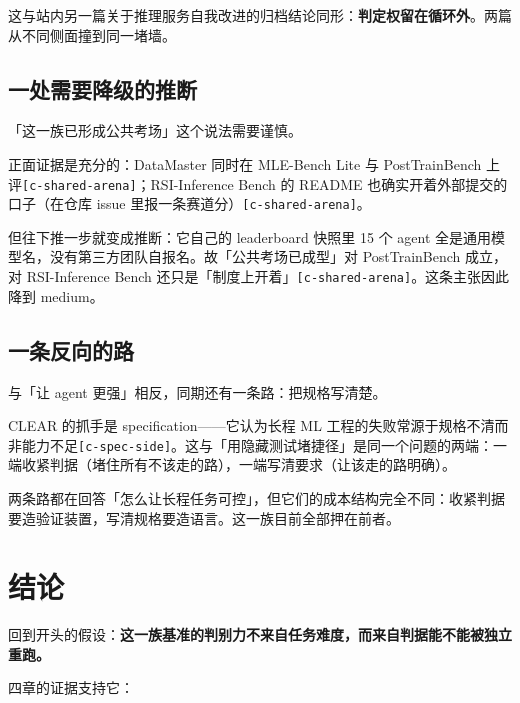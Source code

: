 这与站内另一篇关于推理服务自我改进的归档结论同形：\textbf{判定权留在循环外}。两篇从不同侧面撞到同一堵墙。


\subsection{一处需要降级的推断}

「这一族已形成公共考场」这个说法需要谨慎。


正面证据是充分的：DataMaster 同时在 MLE-Bench Lite 与 PostTrainBench 上评{\scriptsize\texttt{[c-\hspace{0pt}shared-\hspace{0pt}arena]}}；RSI-Inference Bench 的 README 也确实开着外部提交的口子（在仓库 issue 里报一条赛道分）{\scriptsize\texttt{[c-\hspace{0pt}shared-\hspace{0pt}arena]}}。


但往下推一步就变成推断：它自己的 leaderboard 快照里 15 个 agent 全是通用模型名，没有第三方团队自报名。故「公共考场已成型」对 PostTrainBench 成立，对 RSI-Inference Bench 还只是「制度上开着」{\scriptsize\texttt{[c-\hspace{0pt}shared-\hspace{0pt}arena]}}。这条主张因此降到 medium。


\subsection{一条反向的路}

与「让 agent 更强」相反，同期还有一条路：把规格写清楚。


CLEAR 的抓手是 specification——它认为长程 ML 工程的失败常源于规格不清而非能力不足{\scriptsize\texttt{[c-\hspace{0pt}spec-\hspace{0pt}side]}}。这与「用隐藏测试堵捷径」是同一个问题的两端：一端收紧判据（堵住所有不该走的路），一端写清要求（让该走的路明确）。


两条路都在回答「怎么让长程任务可控」，但它们的成本结构完全不同：收紧判据要造验证装置，写清规格要造语言。这一族目前全部押在前者。


\section{结论}

回到开头的假设：\textbf{这一族基准的判别力不来自任务难度，而来自判据能不能被独立重跑。}


四章的证据支持它：


